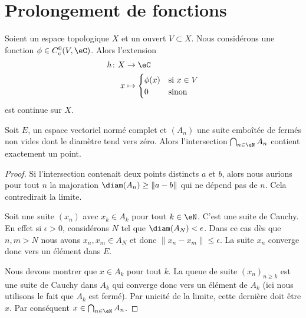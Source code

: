 
\section{Prolongement de fonctions}

\begin{lemma}       \label{LEMooTUQIooEyTLBa}
	Soient un espace topologique \( X\) et un ouvert \( V\subset X\). Nous considérons une fonction \( \phi\in C^0_c(V,\eC)\). Alors l'extension
	\begin{equation}
		\begin{aligned}
			h\colon X & \to\eC                              \\
			x         & \mapsto \begin{cases}
				                    \phi(x) & \text{si } x\in V \\
				                    0       & \text{sinon }
			                    \end{cases}
		\end{aligned}
	\end{equation}
	est continue sur \( X\).
\end{lemma}

\begin{lemma}   \label{LemdCOMQM}
	Soit \( E\), un espace vectoriel normé complet et \( (A_n)\) une suite emboîtée de fermés non vides dont le diamètre tend vers zéro. Alors l'intersection \( \bigcap_{n\in \eN}A_n\) contient exactement un point.
\end{lemma}

\begin{proof}
	Si l'intersection contenait deux points distincts \( a\) et \( b\), alors nous aurions pour tout \( n\) la majoration \( \diam(A_n)\geq\| a-b \|\) qui ne dépend pas de \( n\). Cela contredirait la limite.

	Soit une suite \( (x_n)\) avec \( x_k\in A_k\) pour tout \( k\in \eN\). C'est une suite de Cauchy. En effet si \( \epsilon>0\), considérons \( N\) tel que \( \diam(A_N)<\epsilon\). Dans ce cas dès que \( n,m>N\) nous avons \( x_n,x_m\in A_{N}\) et donc \( \| x_n-x_m \|\leq \epsilon\). La suite \( x_n\) converge donc vers un élément dans \( E\).

	Nous devons montrer que \( x\in A_k\) pour tout \( k\). La queue de suite \( (x_n)_{n\geq k}\) est une suite de Cauchy dans \( A_k\) qui converge donc vers un élément de \( A_k\) (ici nous utilisons le fait que \( A_k\) est fermé). Par unicité de la limite, cette dernière doit être \( x\). Par conséquent \( x\in\bigcap_{n\in \eN}A_n\).
\end{proof}

